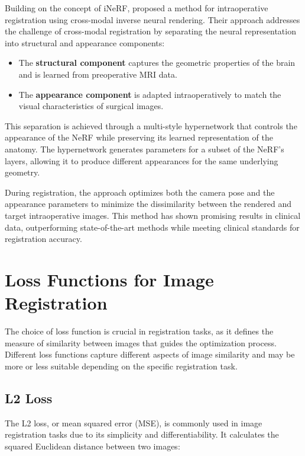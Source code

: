 Building on the concept of iNeRF, \textcite{fehrentz2024intraoperative} proposed a method for intraoperative registration using cross-modal inverse neural rendering. Their approach addresses the challenge of cross-modal registration by separating the neural representation into structural and appearance components:

\begin{itemize}
    \item The \textbf{structural component} captures the geometric properties of the brain and is learned from preoperative MRI data.
    
    \item The \textbf{appearance component} is adapted intraoperatively to match the visual characteristics of surgical images.
\end{itemize}

This separation is achieved through a multi-style hypernetwork that controls the appearance of the NeRF while preserving its learned representation of the anatomy. The hypernetwork generates parameters for a subset of the NeRF's layers, allowing it to produce different appearances for the same underlying geometry.

During registration, the approach optimizes both the camera pose and the appearance parameters to minimize the dissimilarity between the rendered and target intraoperative images. This method has shown promising results in clinical data, outperforming state-of-the-art methods while meeting clinical standards for registration accuracy.

\section{Loss Functions for Image Registration}

The choice of loss function is crucial in registration tasks, as it defines the measure of similarity between images that guides the optimization process. Different loss functions capture different aspects of image similarity and may be more or less suitable depending on the specific registration task.

\subsection{L2 Loss}

The L2 loss, or mean squared error (MSE), is commonly used in image registration tasks due to its simplicity and differentiability. It calculates the squared Euclidean distance between two images:

